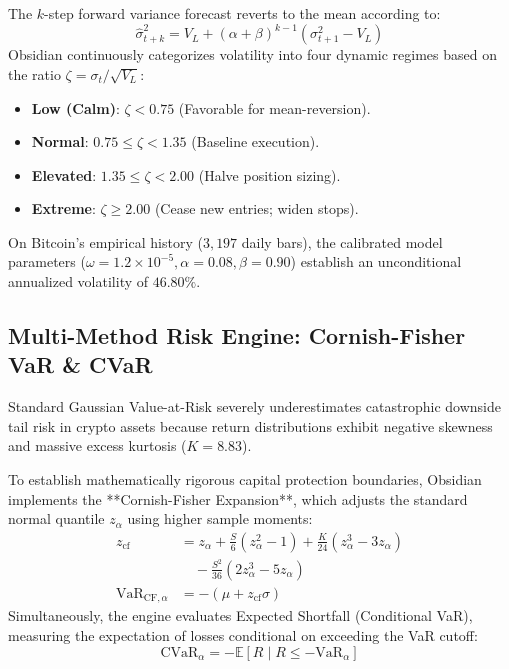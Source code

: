\documentclass[10pt,journal,compsoc]{IEEEtran}
\begin{document}
The $k$-step forward variance forecast reverts to the mean according to:
\begin{equation}
\hat{\sigma}_{t+k}^2 = V_L + (\alpha + \beta)^{k-1}(\sigma_{t+1}^2 - V_L)
\end{equation}
Obsidian continuously categorizes volatility into four dynamic regimes based on the ratio $\zeta = \sigma_t / \sqrt{V_L}$:
\begin{itemize}
    \item \textbf{Low (Calm)}: $\zeta < 0.75$ (Favorable for mean-reversion).
    \item \textbf{Normal}: $0.75 \le \zeta < 1.35$ (Baseline execution).
    \item \textbf{Elevated}: $1.35 \le \zeta < 2.00$ (Halve position sizing).
    \item \textbf{Extreme}: $\zeta \ge 2.00$ (Cease new entries; widen stops).
\end{itemize}

On Bitcoin's empirical history ($3,197$ daily bars), the calibrated model parameters ($\omega = 1.2 \times 10^{-5}, \alpha = 0.08, \beta = 0.90$) establish an unconditional annualized volatility of $46.80\%$.

\subsection{Multi-Method Risk Engine: Cornish-Fisher VaR \& CVaR}
Standard Gaussian Value-at-Risk severely underestimates catastrophic downside tail risk in crypto assets because return distributions exhibit negative skewness and massive excess kurtosis ($K = 8.83$). 

To establish mathematically rigorous capital protection boundaries, Obsidian implements the **Cornish-Fisher Expansion**, which adjusts the standard normal quantile $z_\alpha$ using higher sample moments:
\begin{align}
z_{\text{cf}} &= z_\alpha + \frac{S}{6}(z_\alpha^2 - 1) + \frac{K}{24}(z_\alpha^3 - 3z_\alpha) \nonumber \\
&\quad - \frac{S^2}{36}(2z_\alpha^3 - 5z_\alpha) \\
\text{VaR}_{\text{CF}, \alpha} &= -(\mu + z_{\text{cf}} \sigma)
\end{align}
Simultaneously, the engine evaluates Expected Shortfall (Conditional VaR), measuring the expectation of losses conditional on exceeding the VaR cutoff:
\begin{equation}
\text{CVaR}_\alpha = -\mathbb{E}[R \mid R \le -\text{VaR}_\alpha]
\end{equation}
\end{document}
